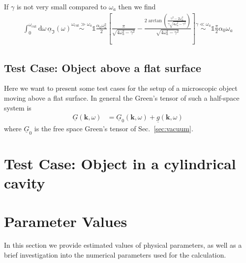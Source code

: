 \documentclass[11pt]{article}
\newcommand{\vv}[1]{\mathbf{#1}}
\newcommand{\dd}[0]{\mathrm{d}}
\begin{document}
If $\gamma$ is not very small compared to $\omega_a$ then we find
\begin{align}
\int_0^{\omega_\mathrm{cut}}\dd\omega\,\underline{\alpha}_\Im(\omega)
\stackrel{\omega_\mathrm{cut}\gg\omega_a}\sim
\mathbb{1}\frac{\alpha_0\omega_a^2}{2}
\left[
  \frac{\pi}{\sqrt{4 \omega_a^2-\gamma ^2}}-\frac{2 \arctan\left(\frac{\gamma ^2-2 \omega_a^2}{\gamma  \sqrt{4 \omega_a^2-\gamma ^2}}\right)}{\sqrt{4 \omega_a^2-\gamma ^2}}
\right]
\stackrel{\gamma\ll\omega_a}\sim\mathbb{1}\frac{\pi}{2}\alpha_0\omega_a
\end{align}
%
%
\subsection{Test Case: Object above a flat surface}
Here we want to present some test cases for the setup of a microscopic object moving above a flat surface. In general the Green's tensor of such a half-space system is
\begin{align}
\underline{G}(\vv k,\omega) &= \underline{G}_0(\vv k, \omega) + \underline{g}(\vv k, \omega)
\end{align}
where $\underline{G}_0$ is the free space Green's tensor of Sec.~\ref{sec:vacuum}.
\section{Test Case: Object in a cylindrical cavity}
\section{Parameter Values}
In this section we provide estimated values of physical parameters, as well as a brief investigation into the numerical parameters used for the calculation.
\end{document}
